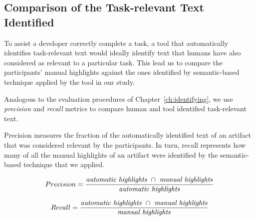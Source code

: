 \clearpage


\subsection{Comparison of the Task-relevant Text Identified}
\label{cp6:comparison}


To assist a developer correctly complete a task, a tool that
automatically identifies task-relevant text would ideally 
identify text that humans have also considered as relevant to a particular task. 
This lead us to compare the participants' manual highlights against the ones 
identified by semantic-based technique applied by the tool in our study.
 



Analogous to the evaluation procedures of Chapter~\ref{ch:identifying}, we use 
\textit{precision} and \textit{recall} metrics
to compare human and tool identified task-relevant text.




Precision measures the fraction of the automatically identified text of an artifact that was  considered relevant
by the participants. 
In turn, recall represents how many of all the manual highlights of an artifact were identified by the semantic-based technique that we applied.

\smallskip
\begin{small}


\begin{equation}
    Precision = \frac{
        \text{\textit{automatic highlights}~} \cap 
        \text{~\textit{manual highlights}}
    }{\text{\textit{automatic highlights}}}
\end{equation}
\end{small}


\begin{small}
\begin{equation}
    Recall = \frac{
        \text{\textit{automatic highlights}~} \cap 
        \text{~\textit{manual highlights}}
    }{\text{\textit{manual highlights}}}
\end{equation}
\end{small}

\medskip














